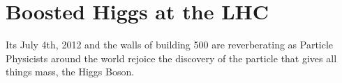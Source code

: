 \chapter{Boosted Higgs at the LHC} \label{chap:higgs}

Its July 4th, 2012 and the walls of building 500 are reverberating as Particle
Physicists around the world rejoice the discovery of the particle that gives all
things mass, the Higgs Boson.







